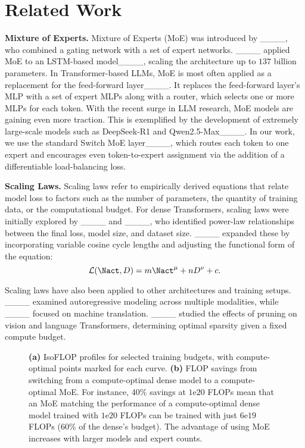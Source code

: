 \section{Related Work}
\textbf{Mixture of Experts.}
Mixture of Experts (MoE) was introduced by ____, who combined a gating network with a set of expert networks. ____ applied MoE to an LSTM-based model____, scaling the architecture up to $137$ billion parameters. In Transformer-based LLMs, MoE is most often applied as a replacement for the feed-forward layer____. It replaces the feed-forward layer's MLP with a set of expert MLPs along with a router, which selects one or more MLPs for each token. With the recent surge in LLM research, MoE models are gaining even more traction. This is exemplified by the development of extremely large-scale models such as DeepSeek-R1 and Qwen2.5-Max____.
In our work, we use the standard Switch MoE layer____, which routes each token to one expert and encourages even token-to-expert assignment via the addition of a differentiable load-balancing loss.

\newpage
\textbf{Scaling Laws.}  
Scaling laws refer to empirically derived equations that relate model loss
to factors such as the number of parameters, the quantity of training data, or the computational budget. For dense Transformers, scaling laws were initially explored by ____ and ____, who identified power-law relationships between the final loss, model size, and dataset size. ____ expanded these by incorporating variable cosine cycle lengths and adjusting the functional form of the equation:
\vspace{-0.1cm}
\begin{equation} \label{eq:scaling_law_chinchilla}
  \mathcal{L}(\Nact, D) = m\Nact^{\mu} + nD^{\nu} + c.
\end{equation}



Scaling laws have also been applied to other architectures and training setups. ____ examined autoregressive modeling across multiple modalities, while ____ focused on machine translation. ____ studied the effects of pruning on vision and language Transformers, determining optimal sparsity given a fixed compute budget.

\begin{figure*}
    \centering
\caption{\textbf{(a)} IsoFLOP profiles for selected training budgets, with compute-optimal points marked for each curve. \textbf{(b)} FLOP savings from switching from a compute-optimal dense model to a compute-optimal MoE. For instance, 40\% savings at $1$e$20$ FLOPs mean that an MoE matching the performance of a compute-optimal dense model trained with $1$e$20$ FLOPs can be trained with just $6$e$19$ FLOPs (60\% of the dense's budget). The advantage of using MoE increases with larger models and expert counts.}
    
  \label{fig:isoflops}
\end{figure*}

